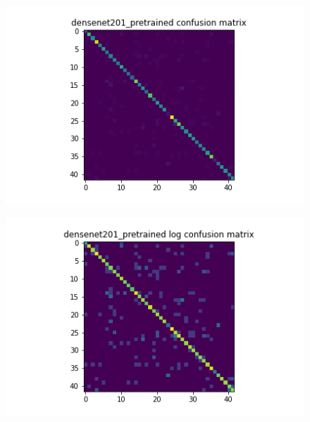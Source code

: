 \begin{figure}[H]
  \begin{minipage}[b]{.5\linewidth}
    \centering
    {\includegraphics[width=1.2\textwidth]{figs/conf_matrix/densenet201_pretrained_conf.png}}
  \end{minipage}
  \hfill
  \begin{minipage}[b]{.5\linewidth}
    \centering

    {\includegraphics[width=1.2\textwidth]{figs/conf_matrix/densenet201_pretrained_log_conf.png}}
  \end{minipage}
  \vfill
  \begin{minipage}[b]{.5\linewidth}
    \centering


\end{minipage}
\end{figure}
